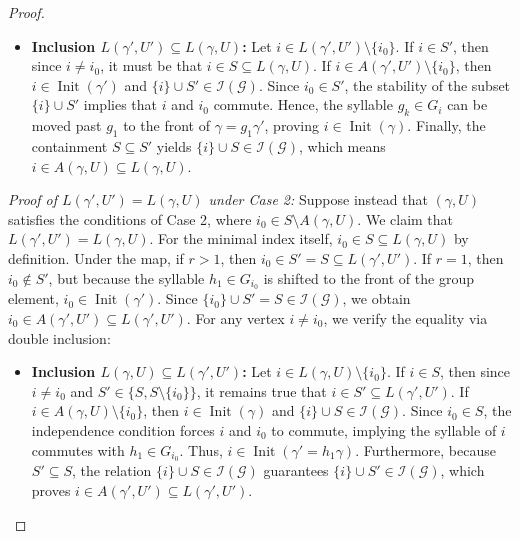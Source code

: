 \documentclass[10pt,a4paper]{amsart}
\begin{document}
\begin{proof}
\begin{itemize}
    \medskip
    \item \textbf{Inclusion $L(\gamma', U') \subseteq L(\gamma, U)$:} Let $i \in L(\gamma', U') \setminus \{i_0\}$. If $i \in S'$, then since $i \neq i_0$, it must be that $i \in S \subseteq L(\gamma, U)$. If $i \in A(\gamma', U') \setminus \{i_0\}$, then $i \in \operatorname{Init}(\gamma')$ and $\{i\} \cup S' \in \mathcal{I}(\mathcal{G})$. Since $i_0 \in S'$, the stability of the subset $\{i\} \cup S'$ implies that $i$ and $i_0$ commute. Hence, the syllable $g_k \in G_i$ can be moved past $g_1$ to the front of $\gamma = g_1 \gamma'$, proving $i \in \operatorname{Init}(\gamma)$. Finally, the containment $S \subseteq S'$ yields $\{i\} \cup S \in \mathcal{I}(\mathcal{G})$, which means $i \in A(\gamma, U) \subseteq L(\gamma, U)$.
\end{itemize}

\smallskip
\noindent\textit{ Proof of $L(\gamma', U') = L(\gamma, U)$  under Case 2:}
Suppose instead that $(\gamma, U)$ satisfies the conditions of Case 2, where $i_0 \in S \setminus A(\gamma, U)$. We claim that $L(\gamma', U') = L(\gamma, U)$. For the minimal index itself, $i_0 \in S \subseteq L(\gamma, U)$ by definition. Under the map, if $r > 1$, then $i_0 \in S' = S \subseteq L(\gamma', U')$. If $r = 1$, then $i_0 \notin S'$, but because the syllable $h_1 \in G_{i_0}$ is shifted to the front of the group element, $i_0 \in \operatorname{Init}(\gamma')$. Since $\{i_0\} \cup S' = S \in \mathcal{I}(\mathcal{G})$, we obtain $i_0 \in A(\gamma', U') \subseteq L(\gamma', U')$. For any vertex $i \neq i_0$, we verify the equality via double inclusion:
\begin{itemize}
    \item \textbf{Inclusion $L(\gamma, U) \subseteq L(\gamma', U')$:} Let $i \in L(\gamma, U) \setminus \{i_0\}$. If $i \in S$, then since $i \neq i_0$ and $S' \in \{S, S \setminus \{i_0\}\}$, it remains true that $i \in S' \subseteq L(\gamma', U')$. If $i \in A(\gamma, U) \setminus \{i_0\}$, then $i \in \operatorname{Init}(\gamma)$ and $\{i\} \cup S \in \mathcal{I}(\mathcal{G})$. Since $i_0 \in S$, the independence condition forces $i$ and $i_0$ to commute, implying the syllable of $i$ commutes with $h_1 \in G_{i_0}$. Thus, $i \in \operatorname{Init}(\gamma' = h_1 \gamma)$. Furthermore, because $S' \subseteq S$, the relation $\{i\} \cup S \in \mathcal{I}(\mathcal{G})$ guarantees $\{i\} \cup S' \in \mathcal{I}(\mathcal{G})$, which proves $i \in A(\gamma', U') \subseteq L(\gamma', U')$.


\end{itemize}
\end{proof}
\end{document}
